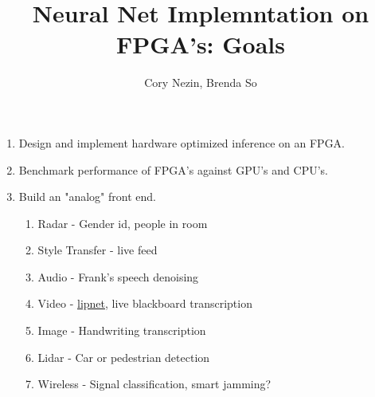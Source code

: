 \documentclass[12pt]{article}
\begin{document}
\title{Neural Net Implemntation on FPGA's: Goals}
\author{Cory Nezin, Brenda So}
\maketitle
\begin{enumerate}
\item Design and implement hardware optimized inference on an FPGA.
\item Benchmark performance of FPGA's against GPU's and CPU's.
\item Build an "analog" front end.
  \begin{enumerate}
    \item Radar - Gender id, people in room
    \item Style Transfer - live feed
    \item Audio - Frank's speech denoising
    \item Video - \href{https://arxiv.org/pdf/1611.01599.pdf}{lipnet}, live blackboard 
      transcription
    \item Image - Handwriting transcription
    \item Lidar - Car or pedestrian detection
    \item Wireless - Signal classification, smart jamming?
  \end{enumerate}
\end{enumerate}
\end{document}
